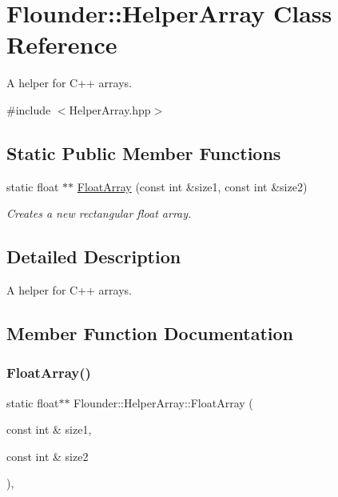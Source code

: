 \hypertarget{class_flounder_1_1_helper_array}{}\section{Flounder\+:\+:Helper\+Array Class Reference}
\label{class_flounder_1_1_helper_array}


A helper for C++ arrays.  




{\ttfamily \#include $<$Helper\+Array.\+hpp$>$}

\subsection*{Static Public Member Functions}
\begin{DoxyCompactItemize}
\item 
static float $\ast$$\ast$ \hyperlink{class_flounder_1_1_helper_array_aa2f549a18699c35dadce6b55002e896d}{Float\+Array} (const int \&size1, const int \&size2)
\begin{DoxyCompactList}\small\item\em Creates a new rectangular float array. \end{DoxyCompactList}\end{DoxyCompactItemize}


\subsection{Detailed Description}
A helper for C++ arrays. 



\subsection{Member Function Documentation}
\mbox{\label{class_flounder_1_1_helper_array_aa2f549a18699c35dadce6b55002e896d}} 
\subsubsection{\texorpdfstring{Float\+Array()}{FloatArray()}}
{\footnotesize\ttfamily static float$\ast$$\ast$ Flounder\+::\+Helper\+Array\+::\+Float\+Array (\begin{DoxyParamCaption}\item[{const int \&}]{size1,  }\item[{const int \&}]{size2 }\end{DoxyParamCaption})\hspace{0.3cm}{\ttfamily [inline]}, {\ttfamily [static]}}



